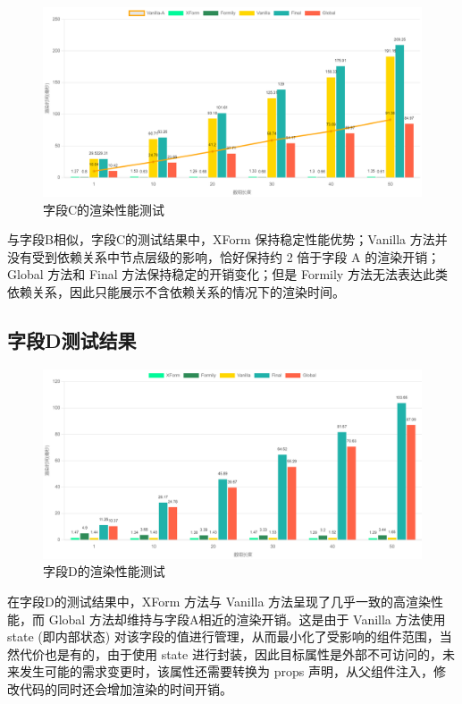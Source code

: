 \documentclass[winfonts,master,twoside]{njuthesis}
\begin{document}
\begin{figure}[h]
    \centering
    \includegraphics[width=\textwidth]{figure/chapter-5/C-update.png}
    \caption{字段C的渲染性能测试}
    \label{render-performence-testcase-C}
\end{figure}

与字段B相似，字段C的测试结果中，XForm 保持稳定性能优势；Vanilla 方法并没有受到依赖关系中节点层级的影响，恰好保持约 2 倍于字段 A 的渲染开销；Global 方法和 Final 方法保持稳定的开销变化；但是 Formily 方法无法表达此类依赖关系，因此只能展示不含依赖关系的情况下的渲染时间。

\subsection{字段D测试结果}

\begin{figure}[h]
    \centering
    \includegraphics[width=\textwidth]{figure/chapter-5/D-update.png}
    \caption{字段D的渲染性能测试}
    \label{render-performence-testcase-D}
\end{figure}

在字段D的测试结果中，XForm 方法与 Vanilla 方法呈现了几乎一致的高渲染性能，而 Global 方法却维持与字段A相近的渲染开销。这是由于 Vanilla 方法使用 state (即内部状态) 对该字段的值进行管理，从而最小化了受影响的组件范围，当然代价也是有的，由于使用 state 进行封装，因此目标属性是外部不可访问的，未来发生可能的需求变更时，该属性还需要转换为 props 声明，从父组件注入，修改代码的同时还会增加渲染的时间开销。
\end{document}
